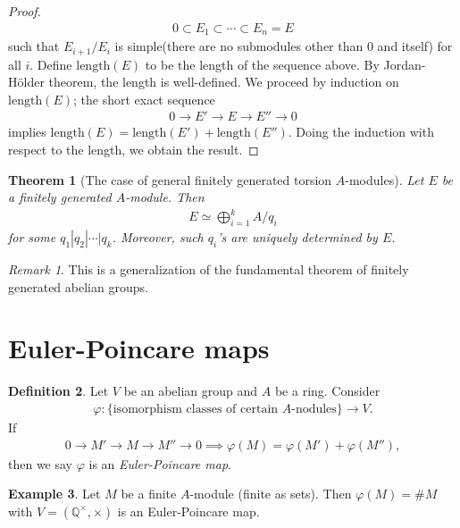 \documentclass[12pt]{report}
\theoremstyle{plain}
\newtheorem{theorem}{Theorem}[section]
\theoremstyle{remark}
\newtheorem*{remark}{Remark}
\theoremstyle{definition}
\newtheorem{definition}[theorem]{Definition}
\newtheorem{example}[theorem]{Example}
\newcommand{\Q}{\mathbb{Q}}
\begin{document}
\begin{proof}
\begin{align*}
        0\subset E_1\subset\cdots\subset E_n=E
    \end{align*}
    such that $E_{i+1}/E_i$ is simple(there are no submodules other than $0$ and itself) for all $i$. Define $\mathrm{length}(E)$ to be the length of the sequence above. By Jordan-H\"older theorem, the length is well-defined. We proceed by induction on $\mathrm{length}(E)$; the short exact sequence
    \begin{align*}
        0\to E'\to E\to E'' \to 0
    \end{align*}
    implies $\mathrm{length}(E)=\mathrm{length}(E')+\mathrm{length}(E'')$. Doing the induction with respect to the length, we obtain the result.
\end{proof}

\begin{theorem}[The case of general finitely generated torsion $A$-modules]
    Let $E$ be a finitely generated $A$-module. Then
    \begin{align*}
        E \simeq \bigoplus_{i=1}^k A/q_i
    \end{align*}
    for some $q_1|q_2|\cdots|q_k$. Moreover, such $q_i$'s are uniquely determined by $E$.
\end{theorem}
\begin{remark}
    This is a generalization of the fundamental theorem of finitely generated abelian groups.
\end{remark}


\section{Euler-Poincare maps}

\begin{definition}
    Let $V$ be an abelian group and $A$ be a ring. Consider
    \begin{align*}
        \varphi:\{\text{isomorphism classes of certain $A$-nodules}\}\to V.
    \end{align*}
    If
    \begin{align*}
        0\to M'\to M\to M''\to 0 \implies \varphi(M)=\varphi(M')+\varphi(M''),
    \end{align*}
    then we say $\varphi$ is an \emph{Euler-Poincare map}.
\end{definition}

\begin{example}
    Let $M$ be a finite $A$-module (finite as sets). Then $\varphi(M)=\# M$ with $V=(\Q^\times,\times)$ is an Euler-Poincare map.
\end{example}
\end{document}
